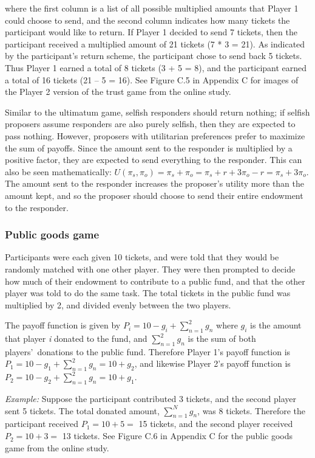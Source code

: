 \documentclass[12pt]{article}
\begin{document}
\noindent where the first column is a list of all possible multiplied amounts that Player 1 could choose to send, and the second column indicates how many tickets the participant would like to return. If Player 1 decided to send 7 tickets, then the participant received a multiplied amount of 21 tickets (7 * 3 = 21). As indicated by the participant\rq s return scheme, the participant chose to send back 5 tickets. Thus Player 1 earned a total of 8 tickets (3 + 5 =  8), and the participant earned a total of 16 tickets (21 -- 5 = 16). See Figure C.5 in Appendix C for images of the Player 2 version of the trust game from the online study.

Similar to the ultimatum game, selfish responders should return nothing; if selfish proposers assume responders are also purely selfish, then they are expected to pass nothing. However, proposers with utilitarian preferences prefer to maximize the sum of payoffs. Since the amount sent to the responder is multiplied by a positive factor, they are expected to send everything to the responder. This can also be seen mathematically: \(U(\pi_{s}, \pi_{o}) = \pi_{s} + \pi_{o} = \pi_{s} + r + 3\pi_{o} - r = \pi_{s} + 3\pi_{o} \). The amount sent to the responder increases the proposer\rq s utility more than the amount kept, and so the proposer should choose to send their entire endowment to the responder.
	
\subsubsection{Public goods game}

Participants were each given 10 tickets, and were told that they would be randomly matched with one other player. They were then prompted to decide how much of their endowment to contribute to a public fund, and that the other player was told to do the same task. The total tickets in the public fund was multiplied by 2, and divided evenly between the two players.

The payoff function is given by \( P_{i} = 10 - g_{i} + \sum_{n=1}^{2} g_{n}\) where \(g_{i}\) is the amount that player \textit{i} donated to the fund, and \(\sum_{n=1}^{2}g_{n}\) is the sum of both players\rq \ donations to the public fund. Therefore Player 1\rq s payoff function is \( P_{1} = 10 - g_{1} + \sum_{n=1}^{2} g_{n} = 10 + g_{2}\), and likewise Player 2\rq s payoff function is \( P_{2} = 10 - g_{2} + \sum_{n=1}^{2} g_{n} = 10 + g_{1}\).

\textit{Example:} Suppose the participant contributed 3 tickets, and the second player sent 5 tickets. The total donated amount, \(\sum_{n=1}^{N} g_{n}\), was 8 tickets. Therefore the participant received \( P_{1} = 10 + 5  = \) 15 tickets, and the second player received \( P_{2} = 10 + 3 = \) 13 tickets. See Figure C.6 in Appendix C for the public goods game from the online study.
\end{document}
